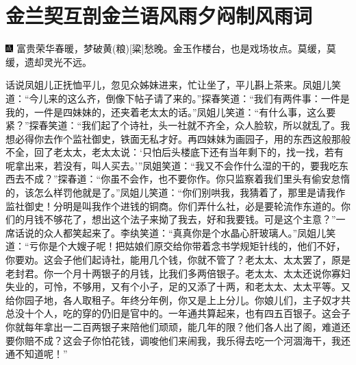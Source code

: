 

\chapter{金兰契互剖金兰语\hspace{.5em}风雨夕闷制风雨词}

{\includegraphics[width=3mm]{../Images/00005}  \kaishu 富贵荣华春暖，梦破黄{{(粮)}}{[}粱{]}愁晚。金玉作楼台，也是戏场妆点。莫缓，莫缓，遗却灵光不远。}

话说凤姐儿正抚恤平儿，忽见众姊妹进来，忙让坐了，平儿斟上茶来。凤姐儿笑道：``今儿来的这么齐，倒像下帖子请了来的。''探春笑道：``我们有两件事：一件是我的，一件是四妹妹的，还夹着老太太的话。''凤姐儿笑道：``有什么事，这么要紧？''探春笑道：``我们起了个诗社，头一社就不齐全，众人脸软，所以就乱了。我想必得你去作个监社御史，铁面无私才好。再四妹妹为画园子，用的东西这般那般不全，回了老太太，老太太说：`只怕后头楼底下还有当年剩下的，找一找，若有呢拿出来，若没有，叫人买去。'''凤姐笑道：``我又不会作什么湿的干的，要我吃东西去不成？''探春道：``你虽不会作，也不要你作。你只监察着我们里头有偷安怠惰的，该怎么样罚他就是了。''凤姐儿笑道：``你们别哄我，我猜着了，那里是请我作监社御史！分明是叫我作个进钱的铜商。你们弄什么社，必是要轮流作东道的。你们的月钱不够花了，想出这个法子来拗了我去，好和我要钱。可是这个主意？''一席话说的众人都笑起来了。李纨笑道：``真真你是个水晶心肝玻璃人。''凤姐儿笑道：``亏你是个大嫂子呢！把姑娘们原交给你带着念书学规矩针线的，他们不好，你要劝。这会子他们起诗社，能用几个钱，你就不管了？老太太、太太罢了，原是老封君。你一个月十两银子的月钱，比我们多两倍银子。老太太、太太还说你寡妇失业的，可怜，不够用，又有个小子，足的又添了十两，和老太太、太太平等。又给你园子地，各人取租子。年终分年例，你又是上上分儿。你娘儿们，主子奴才共总没十个人，吃的穿的仍旧是官中的。一年通共算起来，也有四五百银子。这会子你就每年拿出一二百两银子来陪他们顽顽，能几年的限？他们各人出了阁，难道还要你赔不成？这会子你怕花钱，调唆他们来闹我，我乐得去吃一个河涸海干，我还通不知道呢！''

